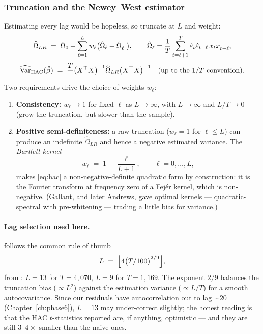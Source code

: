 \subsubsection{Truncation and the Newey--West estimator}

Estimating every lag would be hopeless, so truncate at $L$ and weight:
\begin{equation}
  \widehat\Omega_{LR} \;=\; \hat\Omega_0 + \sum_{\ell=1}^{L} w_\ell
  \bigl(\hat\Omega_\ell + \hat\Omega_\ell^{\top}\bigr),
  \qquad
  \hat\Omega_\ell = \frac{1}{T}\sum_{t=\ell+1}^{T}\hat{\varepsilon}_t\hat{\varepsilon}_{t-\ell}\,x_tx_{t-\ell}^{\top},
  \label{eq:hac}
\end{equation}
\begin{equation}
  \widehat{\operatorname{Var}}_{\text{HAC}}(\hat\beta) \;=\; \frac{T}{\,}\bigl(X^{\top}X\bigr)^{-1}
  \widehat\Omega_{LR}\bigl(X^{\top}X\bigr)^{-1}\quad(\text{up to the }1/T\text{ convention}).
  \label{eq:hac:var}
\end{equation}
Two requirements drive the choice of weights $w_\ell$:
\begin{enumerate}
  \item \textbf{Consistency:} $w_\ell\to1$ for fixed $\ell$ as $L\to\infty$, with
    $L\to\infty$ and $L/T\to0$ (grow the truncation, but slower than the sample).
  \item \textbf{Positive semi-definiteness:} a raw truncation ($w_\ell=1$ for
    $\ell\le L$) can produce an indefinite $\widehat\Omega_{LR}$ and hence a negative
    estimated variance. The \emph{Bartlett kernel}
    \begin{equation}
      w_\ell \;=\; 1-\frac{\ell}{L+1},\qquad \ell=0,\dots,L,
      \label{eq:bartlett}
    \end{equation}
    makes \eqref{eq:hac} a non-negative-definite quadratic form by construction: it is
    the Fourier transform at frequency zero of a Fejér kernel, which is non-negative.
    (Gallant, and later Andrews, gave optimal kernels --- quadratic-spectral with
    pre-whitening --- trading a little bias for variance.)
\end{enumerate}

\paragraph{Lag selection used here.}  follows the common
rule of thumb
\begin{equation}
  L \;=\; \Bigl\lfloor 4\bigl(T/100\bigr)^{2/9}\Bigr\rfloor ,
  \label{eq:haclag}
\end{equation}
from \cite{neweywest1994automatic}: $L=13$ for $T=4{,}070$, $L=9$ for $T=1{,}169$. The
exponent $2/9$ balances the truncation bias ($\propto L^2$) against the estimation
variance ($\propto L/T$) for a smooth autocovariance. Since our residuals have
autocorrelation out to lag $\sim20$ (Chapter~\ref{ch:phase6}), $L=13$ may under-correct
slightly; the honest reading is that the HAC $t$-statistics reported are, if anything,
optimistic --- and they are still $3$--$4\times$ smaller than the naive ones.

